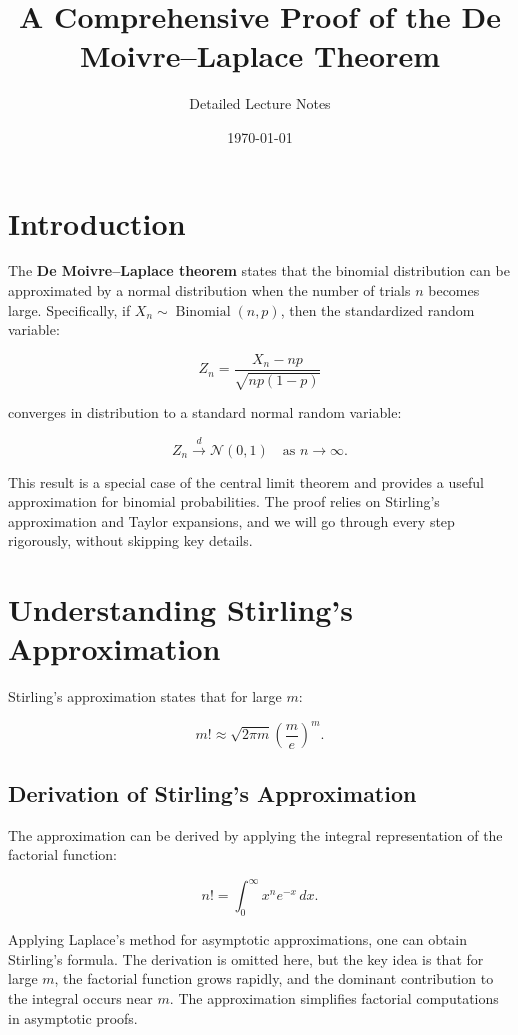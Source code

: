 \documentclass[a4paper,12pt]{article}
\title{A Comprehensive Proof of the De Moivre–Laplace Theorem}
\author{Detailed Lecture Notes}
\date{\today}
\begin{document}
\maketitle

\section{Introduction}

The \textbf{De Moivre–Laplace theorem} states that the binomial distribution can be approximated by a normal distribution when the number of trials $n$ becomes large. Specifically, if $X_n \sim \operatorname{Binomial}(n, p)$, then the standardized random variable:

\[
Z_n = \frac{X_n - np}{\sqrt{np(1-p)}}
\]

converges in distribution to a standard normal random variable:

\[
Z_n \xrightarrow{d} \mathcal{N}(0,1) \quad \text{as } n \to \infty.
\]

This result is a special case of the central limit theorem and provides a useful approximation for binomial probabilities. The proof relies on Stirling's approximation and Taylor expansions, and we will go through every step rigorously, without skipping key details.

\section{Understanding Stirling’s Approximation}

Stirling’s approximation states that for large $m$:

\[
m! \approx \sqrt{2\pi m} \left(\frac{m}{e}\right)^m.
\]

\subsection{Derivation of Stirling's Approximation}

The approximation can be derived by applying the integral representation of the factorial function:

\[
n! = \int_0^\infty x^n e^{-x} \, dx.
\]

Applying Laplace’s method for asymptotic approximations, one can obtain Stirling’s formula. The derivation is omitted here, but the key idea is that for large $m$, the factorial function grows rapidly, and the dominant contribution to the integral occurs near $m$. The approximation simplifies factorial computations in asymptotic proofs.
\end{document}
